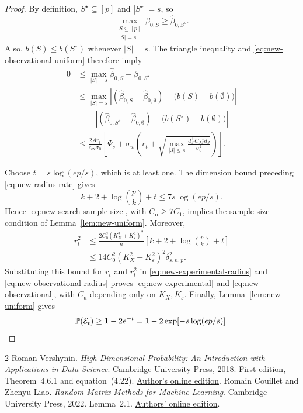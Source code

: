 \documentclass[a4paper,10pt,english]{article}
\theoremstyle{definition}
\begin{document}
\begin{review}
\begin{proof}
By definition, \(S^\star\subseteq[p]\) and \(|S^\star|=s\), so
\[
 \max_{\substack{S\subseteq[p]\\|S|=s}}\hat\beta_{0,S}
 \ge\hat\beta_{0,S^\star}.
\]
\rbreak
Also, \(b(S)\le b(S^\star)\) whenever \(|S|=s\).
\rbreak
The triangle inequality and \eqref{eq:new-observational-uniform}
therefore imply
\begin{equation}\label{eq:new-observational-radius}
 \begin{aligned}
 0
 &\le
 \max_{|S|=s}\hat\beta_{0,S}-\hat\beta_{0,S^\star}\\
 &\le
 \max_{|S|=s}
 \left|
 (\hat\beta_{0,S}-\hat\beta_{0,\emptyset})
 -\bigl(b(S)-b(\emptyset)\bigr)
 \right|\\
 &\quad+
 \left|
 (\hat\beta_{0,S^\star}-\hat\beta_{0,\emptyset})
 -\bigl(b(S^\star)-b(\emptyset)\bigr)
 \right|\\
 &\le
 \frac{2A r_t}{c_{\mathrm{ov}}\sigma_0}
 \left[
 \Psi_s+
 \sigma_w\left(
 r_t+
 \sqrt{
 \max_{|J|\le s}
 \frac{d_J^\top C_{JJ}^{-1}d_J}{\sigma_0^2}
 }
 \right)
 \right].
 \end{aligned}
\end{equation}

Choose \(t=s\log(ep/s)\), which is at least one.
\rbreak
The dimension bound preceding \eqref{eq:new-radius-rate} gives
\[
 k+2+\log\binom pk+t
 \le7s\log(ep/s).
\]
\rbreak
Hence \eqref{eq:new-search-sample-size}, with
\(C_{\mathrm n}\ge7C_1\), implies the sample-size condition of
Lemma~\ref{lem:new-uniform}.
\rbreak
Moreover,
\begin{equation}\label{eq:new-radius-specialized}
 \begin{aligned}
 r_t^2
 &\le
 \frac{2C_0^2(K_X^2+K_\varepsilon^2)^2}{n}
 \left[k+2+\log\binom pk+t\right]\\
 &\le
 14C_0^2(K_X^2+K_\varepsilon^2)^2
 \delta_{s,n,p}^2.
 \end{aligned}
\end{equation}
\rbreak
Substituting this bound for \(r_t\) and \(r_t^2\) in
\eqref{eq:new-experimental-radius} and
\eqref{eq:new-observational-radius} proves
\eqref{eq:new-experimental} and \eqref{eq:new-observational},
with \(C_{\mathrm u}\) depending only on \(K_X,K_\varepsilon\).
\rbreak
Finally, Lemma~\ref{lem:new-uniform} gives
\[
 \mathbb P(\mathcal E_t)
 \ge1-2e^{-t}
 =
 1-2\exp[-s\log(ep/s)].\qedhere
\]
\end{proof}
\end{review}

\begin{thebibliography}{2}
Roman Vershynin.
\newblock \emph{High-Dimensional Probability: An Introduction with
Applications in Data Science}.
\newblock Cambridge University Press, 2018.
\newblock First edition, Theorem~4.6.1 and equation~(4.22).
\newblock \href{https://webapps.math.uci.edu/~rvershyn/papers/HDP-book/HDP-1.pdf}{Author's online edition}.
Romain Couillet and Zhenyu Liao.
\newblock \emph{Random Matrix Methods for Machine Learning}.
\newblock Cambridge University Press, 2022.
\newblock Lemma~2.1.
\newblock \href{https://polaris.imag.fr/romain.couillet/docs/RMT_ML_Book.pdf}{Authors' online edition}.
\end{thebibliography}
\end{document}
